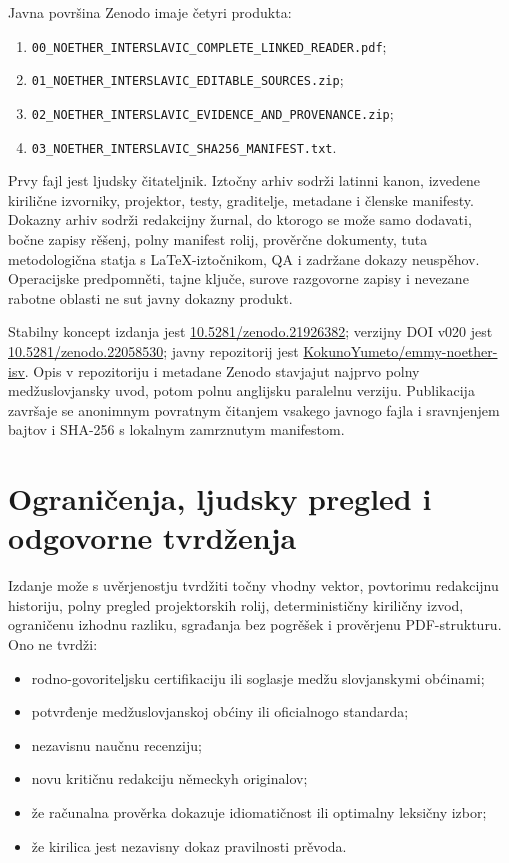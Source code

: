 \documentclass[11pt]{article}
\newcommand{\code}[1]{\texttt{#1}}
\newcommand{\doiurl}[1]{\href{https://doi.org/#1}{#1}}
\newcommand{\repo}{\href{https://github.com/KokunoYumeto/emmy-noether-isv}{KokunoYumeto/emmy-noether-isv}}
\begin{document}
Javna površina Zenodo imaje četyri produkta:

\begin{enumerate}
\item \code{00\_NOETHER\_INTERSLAVIC\_COMPLETE\_LINKED\_READER.pdf};
\item \code{01\_NOETHER\_INTERSLAVIC\_EDITABLE\_SOURCES.zip};
\item \code{02\_NOETHER\_INTERSLAVIC\_EVIDENCE\_AND\_PROVENANCE.zip};
\item \code{03\_NOETHER\_INTERSLAVIC\_SHA256\_MANIFEST.txt}.
\end{enumerate}

Prvy fajl jest ljudsky čitateljnik. Iztočny arhiv sodrži latinni kanon, izvedene kirilične izvorniky, projektor, testy, graditelje, metadane i členske manifesty. Dokazny arhiv sodrži redakcijny žurnal, do ktorogo se može samo dodavati, bočne zapisy rěšenj, polny manifest rolij, prověrčne dokumenty, tuta metodologična statja s LaTeX-iztočnikom, QA i zadržane dokazy neuspěhov. Operacijske predpomněti, tajne ključe, surove razgovorne zapisy i nevezane rabotne oblasti ne sut javny dokazny produkt.

Stabilny koncept izdanja jest \doiurl{10.5281/zenodo.21926382}; verzijny DOI v020 jest \doiurl{10.5281/zenodo.22058530}; javny repozitorij jest \repo. Opis v repozitoriju i metadane Zenodo stavjajut najprvo polny medžuslovjansky uvod, potom polnu anglijsku paralelnu verziju. Publikacija završaje se anonimnym povratnym čitanjem vsakego javnogo fajla i sravnjenjem bajtov i SHA-256 s lokalnym zamrznutym manifestom.

\section{Ograničenja, ljudsky pregled i odgovorne tvrdženja}

Izdanje može s uvěrjenostju tvrdžiti točny vhodny vektor, povtorimu redakcijnu historiju, polny pregled projektorskih rolij, determinističny kiriličny izvod, ograničenu izhodnu razliku, sgrađanja bez pogrěšek i prověrjenu PDF-strukturu. Ono ne tvrdži:

\begin{itemize}
\item rodno-govoriteljsku certifikaciju ili soglasje medžu slovjanskymi obćinami;
\item potvrđenje medžuslovjanskoj obćiny ili oficialnogo standarda;
\item nezavisnu naučnu recenziju;
\item novu kritičnu redakciju německyh originalov;
\item že računalna prověrka dokazuje idiomatičnost ili optimalny leksičny izbor;
\item že kirilica jest nezavisny dokaz pravilnosti prěvoda.
\end{itemize}
\end{document}
